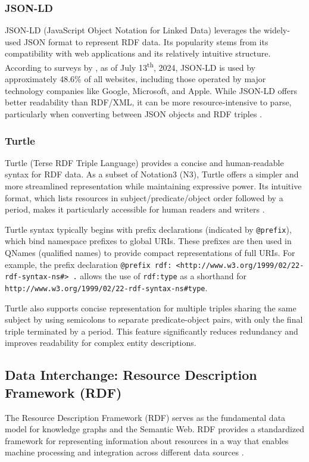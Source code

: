 \subsubsection{JSON-LD}
JSON-LD (JavaScript Object Notation for Linked Data) leverages the widely-used JSON format to represent RDF data. Its popularity stems from its compatibility with web applications and its relatively intuitive structure. According to surveys by \cite{W3TechsJSONLD}, as of July 13\textsuperscript{th}, 2024, JSON-LD is used by approximately 48.6\% of all websites, including those operated by major technology companies like Google, Microsoft, and Apple. While JSON-LD offers better readability than RDF/XML, it can be more resource-intensive to parse, particularly when converting between JSON objects and RDF triples \citep{rdfser2019}.

\subsubsection{Turtle}
\label{turtle}
Turtle (Terse RDF Triple Language) provides a concise and human-readable syntax for RDF data. As a subset of Notation3 (N3), Turtle offers a simpler and more streamlined representation while maintaining expressive power. Its intuitive format, which lists resources in subject/predicate/object order followed by a period, makes it particularly accessible for human readers and writers \citep{swont2011}.

Turtle syntax typically begins with prefix declarations (indicated by \texttt{@prefix}), which bind namespace prefixes to global URIs. These prefixes are then used in QNames (qualified names) to provide compact representations of full URIs. For example, the prefix declaration \texttt{@prefix rdf: <http://www.w3.org/1999/02/22-rdf-syntax-ns\#> .} allows the use of \texttt{rdf:type} as a shorthand for \texttt{http://www.w3.org/1999/02/22-rdf-syntax-ns\#type}.

Turtle also supports concise representation for multiple triples sharing the same subject by using semicolons to separate predicate-object pairs, with only the final triple terminated by a period. This feature significantly reduces redundancy and improves readability for complex entity descriptions.

\subsection{Data Interchange: Resource Description Framework (RDF)}
The Resource Description Framework (RDF) serves as the fundamental data model for knowledge graphs and the Semantic Web. RDF provides a standardized framework for representing information about resources in a way that enables machine processing and integration across different data sources \citep{libsw2014}.

